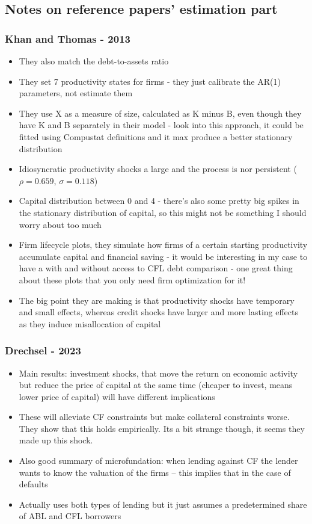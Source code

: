 \documentclass[12pt]{article}
\begin{document}
\newpage
\subsection*{Notes on reference papers' estimation part}
\subsubsection*{Khan and Thomas - 2013 \checkmark}
\begin{itemize}\setlength\itemsep{0em} \small
    \item They also match the debt-to-assets ratio
    \item They set 7 productivity states for firms - they just calibrate the AR(1) parameters, not estimate them
    \item They use X as a measure of size, calculated as K minus B, even though they have K and B separately in their model - look into this approach, it could be fitted using Compustat definitions and it max produce a better stationary distribution
    \item Idiosyncratic productivity shocks a large and the process is nor persistent ($\rho = 0.659$, $\sigma = 0.118$)
    \item Capital distribution between 0 and 4 - there's also some pretty big spikes in the stationary distribution of capital, so this might not be something I should worry about too much
    \item Firm lifecycle plots, they simulate how firms of a certain starting productivity accumulate capital and financial saving - it would be interesting in my case to have a with and without access to CFL debt comparison - one great thing about these plots that you only need firm optimization for it!
    \item The big point they are making is that productivity shocks have temporary and small effects, whereas credit shocks have larger and more lasting effects as they induce misallocation of capital
\end{itemize} \normalsize


\subsubsection*{Drechsel - 2023 \checkmark}
\begin{itemize}\setlength\itemsep{0em} \small
    \item Main results: investment shocks, that move the return on economic activity but reduce the price of capital at the same time (cheaper to invest, means lower price of capital) will have different implications
    \item These will alleviate CF constraints but make collateral constraints worse. They show that this holds empirically. Its a bit strange though, it seems they made up this shock. 
    \item Also good summary of microfundation: when lending against CF the lender wants to know the valuation of the firms – this implies that in the case of defaults 
    \item Actually uses both types of lending but it just assumes a predetermined share of ABL and CFL borrowers
\end{itemize} \normalsize
\end{document}
